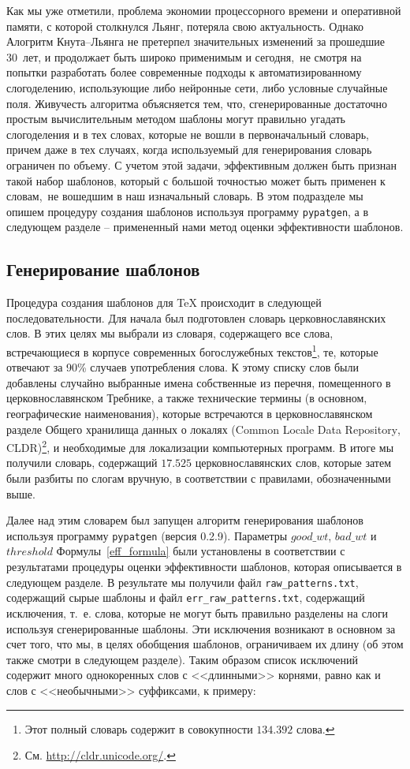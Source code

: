 \documentclass[12pt,a4paper,oneside]{extarticle}
\begin{document}
Как мы уже отметили, проблема экономии процессорного времени и оперативной памяти, с которой столкнулся Льянг, потеряла свою актуальность. Однако Алогритм Кнута--Льянга не претерпел значительных изменений за прошедшие 30~лет, и продолжает быть широко применимым и сегодня, не смотря на попытки разработать более современные подходы к автоматизированному слогоделению, использующие либо нейронные сети\autocite[К примеру, ][]{smrz1996}, либо условные случайные поля\autocite[К примеру, см. ][]{trogkanis2010}. Живучесть алгоритма объясняется тем, что, сгенерированные достаточно простым вычислительным методом шаблоны могут правильно угадать слогоделения и в тех словах, которые не вошли в первоначальный словарь, причем даже в тех случаях, когда используемый для генерирования словарь ограничен по объему. С учетом этой задачи, эффективным должен быть признан такой набор шаблонов, который с большой точностью может быть применен к словам, не вошедшим в наш изначальный словарь. В этом подразделе мы опишем процедуру создания шаблонов используя программу \verb+pypatgen+, а в следующем разделе -- примененный нами метод оценки эффективности шаблонов.

\subsection{Генерирование шаблонов}

Процедура создания шаблонов для \TeX{} происходит в следующей последовательности. Для начала был подготовлен словарь церковнославянских слов. В этих целях мы выбрали из словаря, содержащего все слова, встречающиеся в корпусе современных богослужебных текстов\footnote{Этот полный словарь содержит в совокупности $134.392$ слова.}, те, которые отвечают за 90\% случаев употребления слова. К этому списку слов были добавлены случайно выбранные имена собственные из перечня, помещенного в церковнославянском Требнике, а также технические термины (в основном, географические наименования), которые встречаются в церковнославянском разделе Общего хранилища данных о локалях (\textenglish{Common Locale Data Repository}, CLDR)\footnote{См. \url{http://cldr.unicode.org/}.}, и необходимые для локализации компьютерных программ. В итоге мы получили словарь, содержащий $17.525$ церковнославянских слов, которые затем были разбиты по слогам вручную, в соответствии с правилами, обозначенными выше.

Далее над этим словарем был запущен алгоритм генерирования шаблонов используя программу \verb+pypatgen+ (версия 0.2.9). Параметры $good\_wt$, $bad\_wt$ и $threshold$ Формулы~\ref{eff_formula} были установлены в соответствии с результатами процедуры оценки эффективности шаблонов, которая описывается в следующем разделе. В результате мы получили файл \verb+raw_patterns.txt+, содержащий сырые шаблоны и файл \verb+err_raw_patterns.txt+, содержащий исключения, т.~е. слова, которые не могут быть правильно разделены на слоги используя сгенерированные шаблоны. Эти исключения возникают в основном за счет того, что мы, в целях обобщения шаблонов, ограничиваем их длину (об этом также смотри в следующем разделе). Таким образом список исключений содержит много однокоренных слов с <<длинными>> корнями, равно как и слов с <<необычными>> суффиксами, к примеру:
\end{document}
